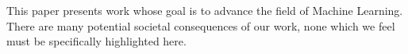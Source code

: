 This paper presents work whose goal is to advance the field of Machine Learning. 
There are many potential societal consequences of our work, none which we feel must be specifically highlighted here.